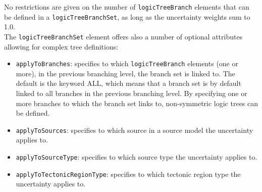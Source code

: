 No restrictions are given on the number of \Verb+logicTreeBranch+ elements that can be defined in a \Verb+logicTreeBranchSet+, as long as the uncertainty weights sum to 1.0.\\
The \Verb+logicTreeBranchSet+ element offers also a number of optional attributes allowing for complex tree definitions:
\begin{itemize}
\item \Verb+applyToBranches+: specifies to which \Verb+logicTreeBranch+ elements (one or more), in the previous branching level, the branch set is linked to. The default is the keyword ALL, which means that a branch set is by default linked to all branches in the previous branching level. By specifying one or more branches to which the branch set links to, non-symmetric logic trees can be defined.
\item \Verb+applyToSources+: specifies to which source in a source model the uncertainty applies to.
\item \Verb+applyToSourceType+: specifies to which source type the uncertainty applies to.
\item \Verb+applyToTectonicRegionType+: specifies to which tectonic region type the uncertainty applies to.
\end{itemize}


